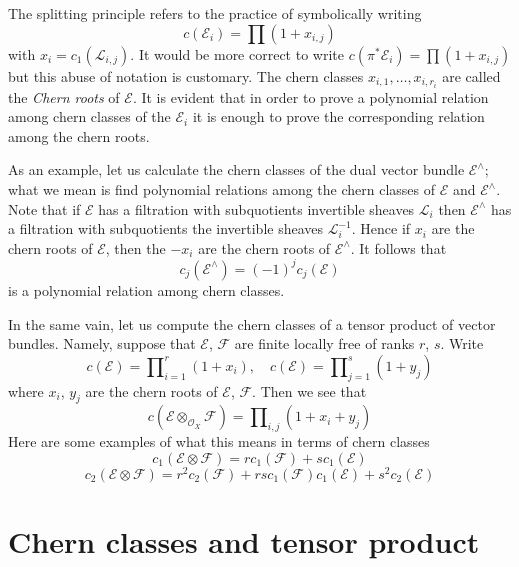 \noindent
The splitting principle refers to the practice of symbolically writing
$$
c(\mathcal{E}_i) = \prod\nolimits (1 + x_{i, j})
$$
with $x_i = c_1(\mathcal{L}_{i, j})$. It would be more correct to
write $c(\pi^*\mathcal{E}_i) = \prod\nolimits (1 + x_{i, j})$
but this abuse of notation is customary. The chern classes
$x_{i, 1}, \ldots, x_{i, r_i}$ are called the {\it Chern roots} of
$\mathcal{E}$. It is evident that in order to prove a polynomial relation
among chern classes of the $\mathcal{E}_i$ it is enough to prove the
corresponding relation among the chern roots.

\medskip\noindent
As an example, let us calculate the chern classes of the
dual vector bundle $\mathcal{E}^\wedge$; what we mean is find
polynomial relations among the chern classes of $\mathcal{E}$ and
$\mathcal{E}^\wedge$. Note that if $\mathcal{E}$ has a filtration with
subquotients invertible sheaves $\mathcal{L}_i$ then $\mathcal{E}^\wedge$
has a filtration with subquotients the invertible sheaves
$\mathcal{L}_i^{-1}$. Hence if $x_i$ are the chern roots of
$\mathcal{E}$, then the $-x_i$ are the chern roots of
$\mathcal{E}^\wedge$. It follows that
$$
c_j(\mathcal{E}^\wedge) = (-1)^j c_j(\mathcal{E})
$$
is a polynomial relation among chern classes.

\medskip\noindent
In the same vain, let us compute the chern classes of
a tensor product of vector bundles.
Namely, suppose that $\mathcal{E}$, $\mathcal{F}$
are finite locally free of ranks $r$, $s$.
Write
$$
c(\mathcal{E}) = \prod\nolimits_{i = 1}^r (1 + x_i),
\quad
c(\mathcal{E}) = \prod\nolimits_{j = 1}^s (1 + y_j)
$$
where $x_i$, $y_j$ are the chern roots of $\mathcal{E}$,
$\mathcal{F}$. Then we see that
$$
c(\mathcal{E} \otimes_{\mathcal{O}_X} \mathcal{F})
=
\prod\nolimits_{i, j} (1 + x_i + y_j)
$$
Here are some examples of what this means in terms of
chern classes
$$
c_1(\mathcal{E} \otimes \mathcal{F})
=
r c_1(\mathcal{F}) + s c_1(\mathcal{E})
$$
$$
c_2(\mathcal{E} \otimes \mathcal{F})
=
r^2 c_2(\mathcal{F}) +
rs c_1(\mathcal{F})c_1(\mathcal{E}) +
s^2 c_2(\mathcal{E})
$$



\section{Chern classes and tensor product}
\label{section-chern-classes-tensor}

